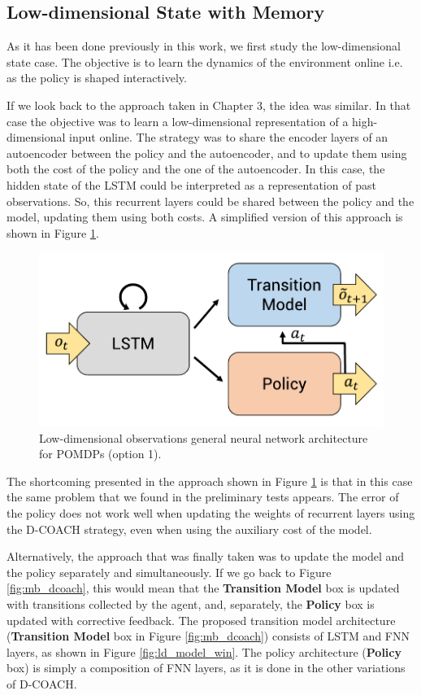 \newpage

\subsection{Low-dimensional State with Memory}
\label{sec:ld_memory}
As it has been done previously in this work, we first study the low-dimensional state case. The objective is to learn the dynamics of the environment online i.e. as the policy is shaped interactively. 

If we look back to the approach taken in Chapter 3, the idea was similar. In that case the objective was to learn a low-dimensional representation of a high-dimensional input online. The strategy was to share the encoder layers of an autoencoder between the policy and the autoencoder, and to update them using both the cost of the policy and the one of the autoencoder. In this case, the hidden state of the LSTM could be interpreted as a representation of past observations. So, this recurrent layers could be shared between the policy and the model, updating them using both costs. A simplified version of this approach is shown in Figure \ref{fig:ld_model_rip}.

\begin{figure}[h]
    \centering
    \includegraphics[width=0.6\linewidth]{imagenes/cap4/ld_model_rip.pdf}
    \caption{Low-dimensional observations general neural network architecture for POMDPs (option 1).}
    \label{fig:ld_model_rip}
\end{figure}

The shortcoming presented in the approach shown in Figure \ref{fig:ld_model_rip} is that in this case the same problem that we found in the preliminary tests appears. The error of the policy does not work well when updating the weights of recurrent layers using the D-COACH strategy, even when using the auxiliary cost of the model. 

Alternatively, the approach that was finally taken was to update the model and the policy separately and simultaneously. If we go back to Figure \ref{fig:mb_dcoach}, this would mean that the \textbf{Transition Model} box is updated with transitions collected by the agent, and, separately, the \textbf{Policy} box is updated with corrective feedback. The proposed transition model architecture (\textbf{Transition Model} box in Figure \ref{fig:mb_dcoach}) consists of LSTM and FNN layers, as shown in Figure \ref{fig:ld_model_win}. The policy architecture (\textbf{Policy} box) is simply a composition of FNN layers, as it is done in the other variations of D-COACH.

